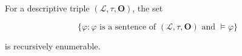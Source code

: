 For a descriptive triple $(\mathcal{L}, \tau, \mathbf{O})$, the set

$$\{ \varphi : \varphi \text{ is a sentence of } (\mathcal{L}, \tau, \mathbf{O}) \text{ and } \models \varphi \}$$

is recursively enumerable.
